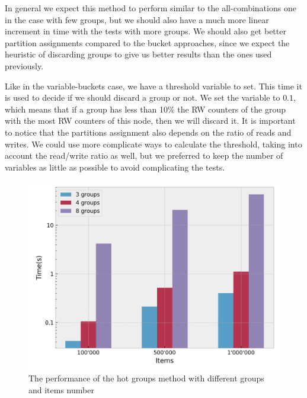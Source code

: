 In general we expect this method to perform similar to the all-combinations one in the case with few groups, but we should also have a much more linear increment in time with the tests with more groups. We should also get better partition assignments compared to the bucket approaches, since we expect the heuristic of discarding groups to give us better results than the ones used previously.

Like in the variable-buckets case, we have a threshold variable to set. This time it is used to decide if we should discard a group or not. We set the variable to $0.1$, which means that if a group has less than 10\% the RW counters of the group with the most RW counters of this node, then we will discard it. It is important to notice that the partitions assignment also depends on the ratio of reads and writes. We could use more complicate ways to calculate the threshold, taking into account the read/write ratio as well, but we preferred to keep the number of variables as little as possible to avoid complicating the tests.

\begin{figure}[!htb]
  \centering
  \includegraphics[width=\textwidth,height=\textheight,keepaspectratio]{img/hot.png}
  \caption{The performance of the hot groups method with different groups and items number}
  \label{fig:hot}
\end{figure}

